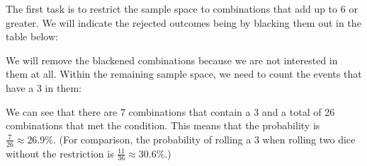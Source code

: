\documentclass{ximera}
\begin{document}
The first task is to restrict the sample space to combinations that add up to 6 or greater. We will indicate the rejected outcomes being by blacking them out in the table below:
\begin{image}
\end{image}
We will remove the blackened combinations because we are not interested in them at all. Within the remaining sample space, we need to count the events that have a 3 in them:
\begin{image}
\end{image}
We can see that there are 7 combinations that contain a 3 and a total of 26 combinations that met the condition. This means that the probability is $\frac{7}{26} \approx 26.9\%$. (For comparison, the probability of rolling a 3 when rolling two dice without the restriction is $\frac{11}{36} \approx 30.6\%$.)
\end{document}
